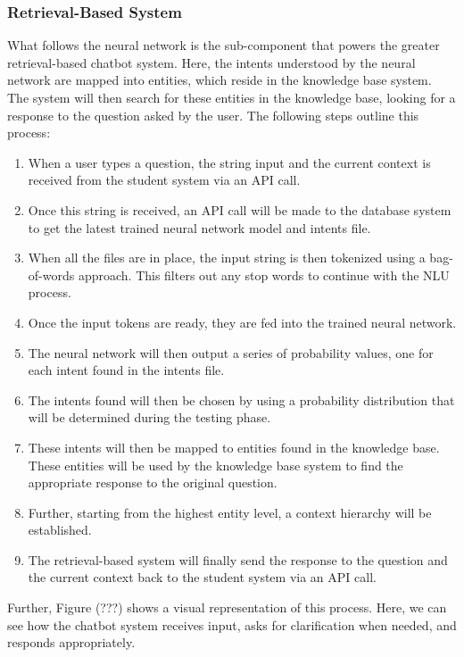 \documentclass[titlepage, 12pt]{article}
\begin{document}
\subsubsection{Retrieval-Based System}

What follows the neural network is the sub-component that powers the greater retrieval-based chatbot system. Here, the intents understood by the neural network are mapped into entities, which reside in the knowledge base system. The system will then search for these entities in the knowledge base, looking for a response to the question asked by the user. The following steps outline this process:

\begin{enumerate}
    \item When a user types a question, the string input and the current context is received from the student system via an API call.
    \item Once this string is received, an API call will be made to the database system to get the latest trained neural network model and intents file.
    \item When all the files are in place, the input string is then tokenized using a bag-of-words approach. This filters out any stop words to continue with the NLU process.
    \item Once the input tokens are ready, they are fed into the trained neural network.
    \item The neural network will then output a series of probability values, one for each intent found in the intents file.
    \item The intents found will then be chosen by using a probability distribution that will be determined during the testing phase.
    \item These intents will then be mapped to entities found in the knowledge base. These entities will be used by the knowledge base system to find the appropriate response to the original question.
    \item Further, starting from the highest entity level, a context hierarchy will be established.
    \item The retrieval-based system will finally send the response to the question and the current context back to the student system via an API call.
\end{enumerate}

Further, Figure (???) shows a visual representation of this process. Here, we can see how the chatbot system receives input, asks for clarification when needed, and responds appropriately.
\end{document}

